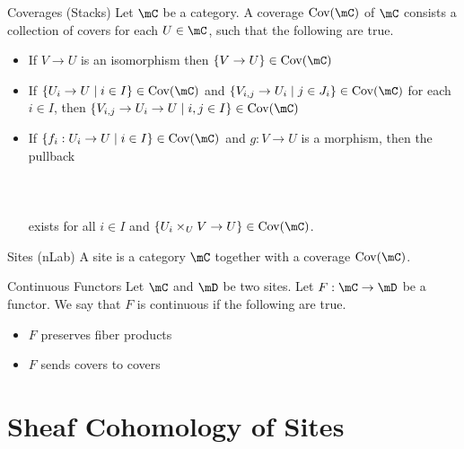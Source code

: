 \documentclass[a4paper]{article}
\begin{document}
\begin{defn}{Coverages (Stacks)}{} Let $\mC$ be a category. A coverage $\text{Cov}(\mC)$ of $\mC$ consists a collection of covers for each $U\in\mC$, such that the following are true. 
\begin{itemize}
\item If $V\to U$ is an isomorphism then $\{V\to U\}\in\text{Cov}(\mC)$
\item If $\{U_i\to U\;|\;i\in I\}\in\text{Cov}(\mC)$ and $\{V_{i,j}\to U_i\;|\;j\in J_i\}\in\text{Cov}(\mC)$ for each $i\in I$, then $\{V_{i,j}\to U_i\to U\;|\;i,j\in I\}\in\text{Cov}(\mC)$
\item If $\{f_i:U_i\to U\;|\;i\in I\}\in\text{Cov}(\mC)$ and $g:V\to U$ is a morphism, then the pullback \\~\\
\\~\\
exists for all $i\in I$ and $\{U_i\times_UV\to U\}\in\text{Cov}(\mC)$. 
\end{itemize}
\end{defn}

\begin{defn}{Sites (nLab)}{} A site is a category $\mC$ together with a coverage $\text{Cov}(\mC)$. 
\end{defn}

\begin{defn}{Continuous Functors}{} Let $\mC$ and $\mD$ be two sites. Let $F:\mC\to\mD$ be a functor. We say that $F$ is continuous if the following are true. 
\begin{itemize}
\item $F$ preserves fiber products
\item $F$ sends covers to covers
\end{itemize}
\end{defn}

\pagebreak
\section{Sheaf Cohomology of Sites}
\end{document}

